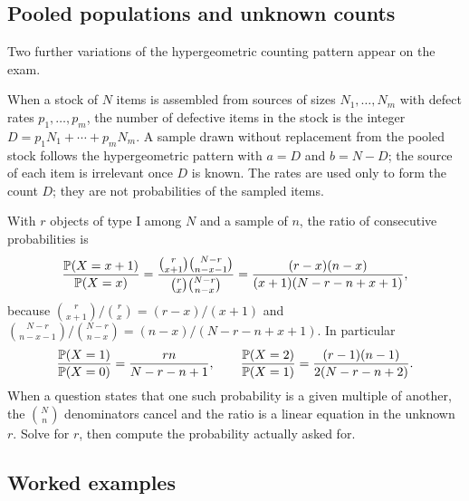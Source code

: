 \subsection{Pooled populations and unknown counts}

Two further variations of the hypergeometric counting pattern appear on the exam.

\begin{keyfact}
When a stock of $N$ items is assembled from sources of sizes $N_1,\dots,N_m$ with defect
rates $p_1,\dots,p_m$, the number of defective items in the stock is the integer
$D = p_1N_1 + \cdots + p_mN_m$. A sample drawn without replacement from the pooled stock
follows the hypergeometric pattern with $a = D$ and $b = N-D$; the source of each item is
irrelevant once $D$ is known. The rates are used only to form the count $D$; they are not
probabilities of the sampled items.
\end{keyfact}

\begin{keyfact}
With $r$ objects of type I among $N$ and a sample of $n$, the ratio of consecutive
probabilities is
\[
\frac{\mathbb{P}(X=x+1)}{\mathbb{P}(X=x)}
= \frac{\binom{r}{x+1}\binom{N-r}{n-x-1}}{\binom{r}{x}\binom{N-r}{n-x}}
= \frac{(r-x)(n-x)}{(x+1)(N-r-n+x+1)} ,
\]
because $\binom{r}{x+1}/\binom{r}{x} = (r-x)/(x+1)$ and
$\binom{N-r}{n-x-1}/\binom{N-r}{n-x} = (n-x)/(N-r-n+x+1)$. In particular
\[
\frac{\mathbb{P}(X=1)}{\mathbb{P}(X=0)} = \frac{rn}{N-r-n+1}, \qquad
\frac{\mathbb{P}(X=2)}{\mathbb{P}(X=1)} = \frac{(r-1)(n-1)}{2(N-r-n+2)} .
\]
When a question states that one such probability is a given multiple of another, the
$\binom{N}{n}$ denominators cancel and the ratio is a linear equation in the unknown $r$.
Solve for $r$, then compute the probability actually asked for.
\end{keyfact}

\subsection{Worked examples}

